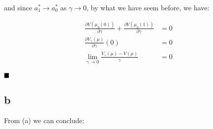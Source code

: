 \documentclass{article}
\begin{document}
and since $a_1^* \to a_0^*$ as $\gamma \to 0$, by what we have seem before,
we have:

\[
\begin{split}
  \frac{\partial V(\mu_0(0))}{\partial \gamma} +
    \frac{\partial V(\mu_0(1))}{\partial \gamma} & = 0 \\
  \frac{\partial V_\gamma(\mu)}{\partial \gamma}(0) & = 0 \\
  \lim_{\gamma \to 0} \frac{V_\gamma(\mu) - V(\mu)}{\gamma} & = 0
\end{split}
\]

$\hfill\blacksquare$ 

\subsection{b}

From (a) we can conclude:








\end{document}
